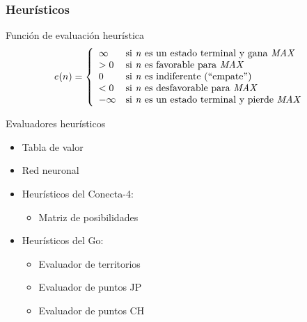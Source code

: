 \documentclass[10pt]{beamer}
\begin{document}

\begin{frame}[squeeze]
\frametitle{Heurísticos}
\begin{block}{Función de evaluación heurística}
\begin{displaymath}
e(n) = \left\{\begin{array}{ll}
\infty & \textnormal{si \textit{n} es un estado terminal y gana \textit{MAX}}\\
>0 & \textnormal{si \textit{n} es favorable para \textit{MAX}}\\
0 & \textnormal{si \textit{n} es indiferente (``empate'')}\\
<0 & \textnormal{si \textit{n} es desfavorable para \textit{MAX}}\\
-\infty & \textnormal{si \textit{n} es un estado terminal y pierde \textit{MAX}}\\
\end{array}\right.
\end{displaymath}
\end{block}

\begin{exampleblock}{Evaluadores heurísticos}
\begin{itemize}
\item Tabla de valor
\item Red neuronal
\item Heurísticos del Conecta-4:
\begin{itemize}
	\item Matriz de posibilidades
\end{itemize}
\item Heurísticos del Go:
\begin{itemize}
	\item Evaluador de territorios
	\item Evaluador de puntos JP
	\item Evaluador de puntos CH
\end{itemize}
\end{itemize}
\end{exampleblock}

\end{frame}
\end{document}
